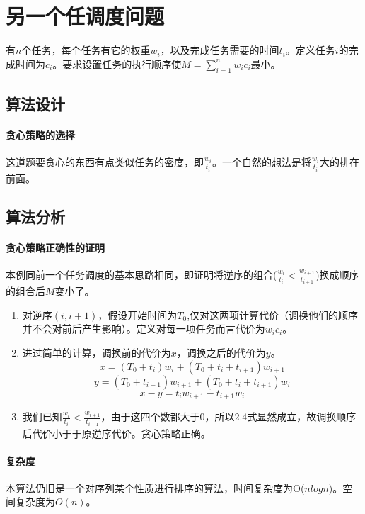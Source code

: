 \section{另一个任调度问题}
\begin{example}
    有$n$个任务，每个任务有它的权重$w_i$，以及完成任务需要的时间$t_i$。定义任务$i$的完成时间为$c_i$。要求设置任务的执行顺序使$M = \sum_{i=1}^n w_ic_i$最小。
\end{example}

\subsection{算法设计}

\paragraph*{贪心策略的选择}
这道题要贪心的东西有点类似任务的密度，即$\frac{w_i}{t_i}$。一个自然的想法是将$\frac{w_i}{t_i}$大的排在前面。

\subsection{算法分析}

\paragraph*{贪心策略正确性的证明}
本例同前一个任务调度的基本思路相同，即证明将逆序的组合($\frac{w_i}{t_i} < \frac{w_{i+1}}{t_{i+1}}$)换成顺序的组合后$M$变小了。

\begin{enumerate}
    \item 对逆序$(i,i+1)$，假设开始时间为$T_0$,仅对这两项计算代价（调换他们的顺序并不会对前后产生影响）。定义对每一项任务而言代价为$w_ic_i$。
    \item 进过简单的计算，调换前的代价为$x$，调换之后的代价为$y$。
    \begin{equation}
        x=(T_0+t_i)w_i+(T_0+t_i+t_{i+1})w_{i+1}
    \end{equation}
    \begin{equation}
        y=(T_0+t_{i+1})w_{i+1}+(T_0+t_i+t_{i+1})w_i
    \end{equation}
    \begin{equation}
        x-y=t_iw_{i+1}-t_{i+1}w_i
    \end{equation}
    \item 我们已知$\frac{w_i}{t_i} < \frac{w_{i+1}}{t_{i+1}}$，由于这四个数都大于0，所以$2.4$式显然成立，故调换顺序后代价小于于原逆序代价。贪心策略正确。
\end{enumerate}

\paragraph*{复杂度}
本算法仍旧是一个对序列某个性质进行排序的算法，时间复杂度为O($nlogn$)。空间复杂度为$O(n)$。
